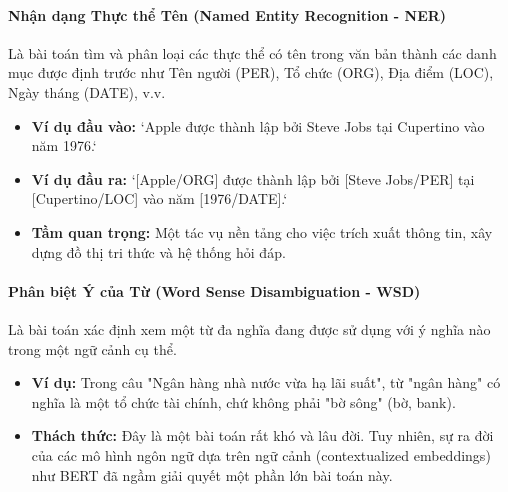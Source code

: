 \paragraph{Nhận dạng Thực thể Tên (Named Entity Recognition - NER)}
Là bài toán tìm và phân loại các thực thể có tên trong văn bản thành các danh mục được định trước như Tên người (PER), Tổ chức (ORG), Địa điểm (LOC), Ngày tháng (DATE), v.v.
\begin{itemize}
    \item \textbf{Ví dụ đầu vào:} `Apple được thành lập bởi Steve Jobs tại Cupertino vào năm 1976.`
    \item \textbf{Ví dụ đầu ra:} `[Apple/ORG] được thành lập bởi [Steve Jobs/PER] tại [Cupertino/LOC] vào năm [1976/DATE].`
    \item \textbf{Tầm quan trọng:} Một tác vụ nền tảng cho việc trích xuất thông tin, xây dựng đồ thị tri thức và hệ thống hỏi đáp.
\end{itemize}

\paragraph{Phân biệt Ý của Từ (Word Sense Disambiguation - WSD)}
Là bài toán xác định xem một từ đa nghĩa đang được sử dụng với ý nghĩa nào trong một ngữ cảnh cụ thể.
\begin{itemize}
    \item \textbf{Ví dụ:} Trong câu "Ngân hàng nhà nước vừa hạ lãi suất", từ "ngân hàng" có nghĩa là một tổ chức tài chính, chứ không phải "bờ sông" (bờ, bank).
    \item \textbf{Thách thức:} Đây là một bài toán rất khó và lâu đời. Tuy nhiên, sự ra đời của các mô hình ngôn ngữ dựa trên ngữ cảnh (contextualized embeddings) như BERT đã ngầm giải quyết một phần lớn bài toán này.
\end{itemize}

